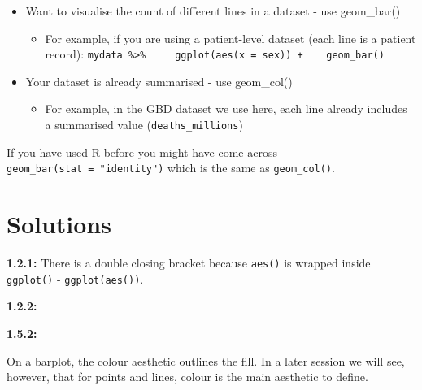 \documentclass[]{book}
\makeatletter
\newenvironment{Shaded}{\begin{snugshade}}{\end{snugshade}}
\newcommand{\DataTypeTok}[1]{\textcolor[rgb]{0.13,0.29,0.53}{#1}}
\newcommand{\KeywordTok}[1]{\textcolor[rgb]{0.13,0.29,0.53}{\textbf{#1}}}
\newcommand{\NormalTok}[1]{#1}
\newcommand{\OperatorTok}[1]{\textcolor[rgb]{0.81,0.36,0.00}{\textbf{#1}}}
\newcommand{\StringTok}[1]{\textcolor[rgb]{0.31,0.60,0.02}{#1}}
\providecommand{\tightlist}{%
  \setlength{\itemsep}{0pt}\setlength{\parskip}{0pt}}
\newenvironment{kframe}{%
\medskip{}
\setlength{\fboxsep}{.8em}
 \def\at@end@of@kframe{}%
 \ifinner\ifhmode%
  \def\at@end@of@kframe{\end{minipage}}%
  \begin{minipage}{\columnwidth}%
 \fi\fi%
 \def\FrameCommand##1{\hskip\@totalleftmargin \hskip-\fboxsep
 \colorbox{shadecolor}{##1}\hskip-\fboxsep
     \hskip-\linewidth \hskip-\@totalleftmargin \hskip\columnwidth}%
 \MakeFramed {\advance\hsize-\width
   \@totalleftmargin\z@ \linewidth\hsize
   \@setminipage}}%
 {\par\unskip\endMakeFramed%
 \at@end@of@kframe}
\renewenvironment{Shaded}{\begin{kframe}}{\end{kframe}}
\theoremstyle{definition}
\theoremstyle{definition}
\theoremstyle{definition}
\theoremstyle{remark}
\makeatother
\begin{document}
\begin{itemize}
\tightlist
\item
  Want to visualise the count of different lines in a dataset - use
  geom\_bar()

  \begin{itemize}
  \tightlist
  \item
    For example, if you are using a patient-level dataset (each line is
    a patient record):
    \texttt{mydata\ \%\textgreater{}\%\ \ \ \ \ ggplot(aes(x\ =\ sex))\ +\ \ \ \ geom\_bar()}
  \end{itemize}
\item
  Your dataset is already summarised - use geom\_col()

  \begin{itemize}
  \tightlist
  \item
    For example, in the GBD dataset we use here, each line already
    includes a summarised value (\texttt{deaths\_millions})
  \end{itemize}
\end{itemize}

If you have used R before you might have come across
\texttt{geom\_bar(stat\ =\ "identity")} which is the same as
\texttt{geom\_col()}.

\hypertarget{solutions}{%
\section{Solutions}\label{solutions}}

\textbf{1.2.1:} There is a double closing bracket because \texttt{aes()}
is wrapped inside \texttt{ggplot()} - \texttt{ggplot(aes())}.

\textbf{1.2.2:}

\begin{Shaded}
\end{Shaded}

\textbf{1.5.2:}

On a barplot, the colour aesthetic outlines the fill. In a later session
we will see, however, that for points and lines, colour is the main
aesthetic to define.
\end{document}
